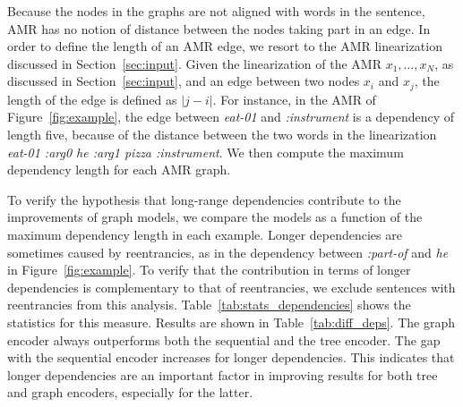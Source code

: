 \documentclass[11pt,a4paper]{article}
\begin{document}
Because the nodes in the graphs are not aligned with words in the sentence, AMR has no notion of distance between the nodes taking part in an edge. In order to define the length of an AMR edge, we resort to the AMR linearization discussed in Section~\ref{sec:input}. Given the linearization of the AMR $x_1, \dots, x_N$, as discussed in Section~\ref{sec:input}, and an edge between two nodes $x_i$ and $x_j$, the length of the edge is defined as $\vert j - i \vert$. 
For instance, in the AMR of Figure~\ref{fig:example}, the edge between \emph{eat-01} and \emph{:instrument} is a dependency of length five, because of the distance between the two words in the linearization \emph{eat-01 :arg0 he :arg1 pizza :instrument}. 
We then compute the maximum dependency length for each AMR graph.

To verify the hypothesis that long-range dependencies contribute to the improvements of graph models, we compare the models as a function of the maximum dependency length in each example. Longer dependencies are sometimes caused by reentrancies, as in the dependency between \emph{:part-of} and \emph{he} in Figure~\ref{fig:example}. To verify that the contribution in terms of longer dependencies is complementary to that of reentrancies, we exclude sentences with reentrancies from this analysis. Table~\ref{tab:stats_dependencies} shows the statistics for this measure. Results are shown in Table~\ref{tab:diff_deps}. The graph encoder always outperforms both the sequential and the tree encoder. The gap with the sequential encoder increases for longer dependencies. This indicates that longer dependencies are an important factor in improving results for both tree and graph encoders, especially for the latter.

\end{document}

